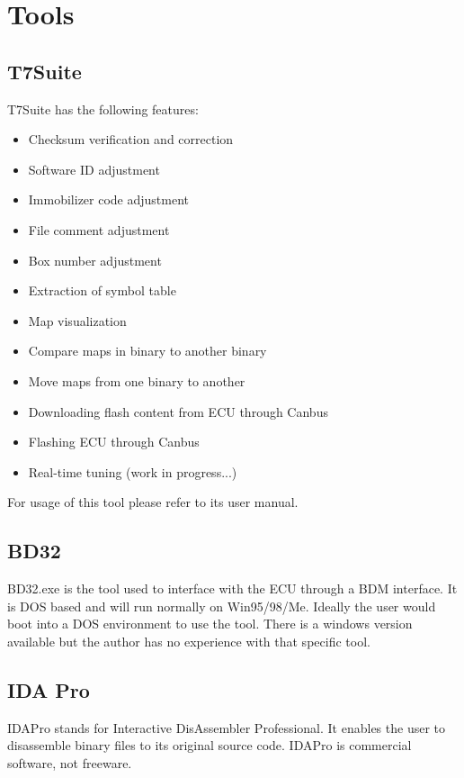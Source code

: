 \documentclass[11pt,a4paper]{book}
\begin{document}
\chapter{Tools}
\section{T7Suite}
T7Suite has the following features:
\begin{itemize}
    \item Checksum verification and correction
    \item Software ID adjustment
    \item Immobilizer code adjustment
    \item File comment adjustment
    \item Box number adjustment
    \item Extraction of symbol table
    \item Map visualization
    \item Compare maps in binary to another binary
    \item Move maps from one binary to another
    \item Downloading flash content from ECU through Canbus
    \item Flashing ECU through Canbus
    \item Real-time tuning (work in progress...)
\end{itemize}

For usage of this tool please refer to its user manual.

\section{BD32}
BD32.exe is the tool used to interface with the ECU through a BDM interface. It
is DOS based and will run normally on Win95/98/Me. Ideally the user would boot
into a DOS environment to use the tool. There is a windows version available but
the author has no experience with that specific tool.

\section{IDA Pro}
IDAPro stands for Interactive DisAssembler Professional. It enables the user to
disassemble binary files to its original source code. IDAPro is commercial
software, not freeware.
\end{document}
